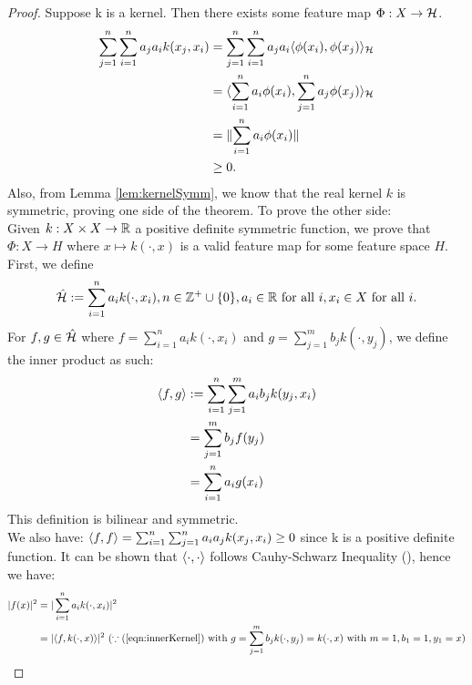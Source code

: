 \documentclass[twoside]{memoir}
\begin{document}
	\begin{proof}
		Suppose k is a kernel. Then there exists some feature map $\Phi: X \rightarrow \mathcal{H}$.
		\begin{equation*}
		\begin{split}
		\sum_{j=1}^{n} \sum_{i=1}^{n} a_j a_i k(x_j, x_i) &= 
		\sum_{j=1}^{n} \sum_{i=1}^{n} a_j a_i \langle\phi(x_i), \phi(x_j)\rangle_{\mathcal{H}} \\
		&= \langle\sum_{i=1}^{n} a_i \phi(x_i), \sum_{j=1}^{n} a_j \phi(x_j)\rangle_{\mathcal{H}} \\
		&= \lVert\sum_{i=1}^{n} a_i \phi(x_i)\rVert \\
		&\geq 0.
		\end{split}
		\end{equation*}
		Also, from Lemma \ref{lem:kernelSymm}, we know that the real kernel $k$ is symmetric, proving one side of the theorem. To prove the other side: \\
		Given $k:X \times X \rightarrow \mathbb{R}$ a positive definite symmetric function, we prove that $\Phi: X \rightarrow H$ where $x \mapsto k(\cdot, x)$ is a valid feature map for some feature space $H$. First, we define
		\[ \hat{\mathcal{H}} := \sum_{i=1}^{n} a_i k(\cdot, x_i), n \in \mathbb{Z}^+ \cup \{0\}, a_i \in \mathbb{R} \text{ for all } i, x_i \in X \text{ for all } i. \]
		For $f, g \in \hat{\mathcal{H}}$ where $f = \sum_{i=1}^{n}a_i k(\cdot, x_i)$ and $g = \sum_{j=1}^{m}b_j k(\cdot, y_j)$, we define the inner product as such:\
		\begin{equation} \label{eqn:innerKernel}
		\begin{split}
		\langle f, g\rangle  &:= \sum_{i=1}^{n} \sum_{j=1}^{m} a_i b_j k(y_j, x_i) \\
		&= \sum_{j=1}^{m} b_j f(y_j) \\
		&= \sum_{i=1}^{n} a_ig(x_i) 
		\end{split}
		\end{equation}
		This definition is bilinear and symmetric. \\
		We also have: $\langle f, f\rangle = \sum_{i=1}^{n}\sum_{j=1}^{n}a_i a_j k(x_j, x_i) \geq 0 $ since k is a positive definite function. It can be shown that $\langle\cdot, \cdot\rangle$ follows Cauhy-Schwarz Inequality (\cite{steinwartSVM}), hence we have:
		\begin{equation*}
		\begin{split}
		|f(x)|^2 &= |\sum_{i=1}^{n}a_ik(\cdot, x_i)|^2 \\
		&= |\inner{f, k(\cdot, x)}|^2 ~ (\because (\ref{eqn:innerKernel}) \text{ with } g = \sum_{j=1}^{m}b_j k(\cdot, y_j) = k(\cdot, x) \text{ with } m=1, b_1 = 1, y_1 = x)\\

\end{split}
\end{equation*}
\end{proof}
\end{document}

